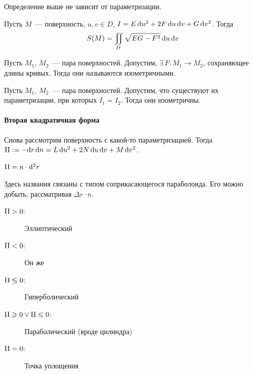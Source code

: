 \documentclass[draft,timbord]{longnotes}
\begin{document}
\begin{thrm}\label{thrm:dg::area::manifoldcor}
  Определение выше не зависит от параметризации.
\end{thrm}

\begin{thrm}\label{thrm:dg::area::area}
  Пусть $M$~--- поверхность, $u,v\in D$, $I = E \, \mathrm{d} u^2 + 2F\, \mathrm{d} u \,\mathrm{d} v + G\, \mathrm{d} v^2$.
  Тогда
  \[
    S(M) = \iint_D \sqrt{EG - F^2}\, \mathrm{d} u\,\mathrm{d} v
  \]
\end{thrm}

\begin{defn}\label{defn:dg::area::isom}
  Пусть $M_1$, $M_2$~--- пара поверхностей. Допустим, $\exists\, F \colon M_1 \to M_2$, 
  сохраняющее длины кривых. Тогда они называются  изометричными.
\end{defn}

\begin{thrm}\label{thrm:dg::area::Iisom}
  Пусть $M_1$, $M_2$~--- пара поверхностей. Допустим, что существуют их параметризации, 
  при которых $I_1= I_2$. Тогда они изометричны.
\end{thrm}

\paragraph{Вторая квадратичная форма}
\label{par:dg::II}

\begin{defn}\label{defn:dg::II}
  Снова рассмотрим поверхность с  какой-то параметризацией. Тогда 
  ${\rm II} := - \mathrm{d} r \, \mathrm{d} n = L \, \mathrm{d} u^2 + 2N\, \mathrm{d} u \,\mathrm{d} v + M\, \mathrm{d} v^2$.
\end{defn}

\begin{prop}\label{prop:dg::II}
  ${\rm II} = n \cdot \mathrm{d}^2 r$
\end{prop}

\begin{prop}\label{prop:dg::II::ptypes}
  Здесь названия связаны с типом соприкасающегося параболоида. Его можно добыть, рассматривая
  $\Delta r \cdot n$.
  \begin{description}
    \item[${\rm II} > 0$:] Эллиптический
    \item[${\rm II} < 0$:] Он же
    \item[${\rm II} \lessgtr 0$:] Гиперболический
    \item[${\rm II} \geqslant 0 \lor {\rm II} \leqslant 0$:] Параболический (вроде цилиндра)
    \item[${\rm II} = 0$:] Точка уплощения
  \end{description}
\end{prop}
\end{document}
